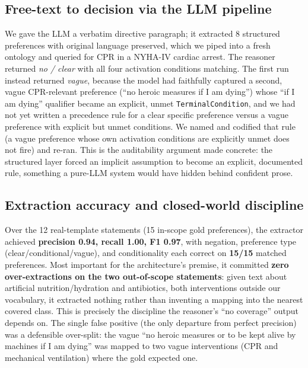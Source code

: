 \documentclass[10pt]{article}
\newcommand{\onto}[1]{\texttt{\small #1}}
\begin{document}
\subsection{Free-text to decision via the LLM pipeline}
We gave the LLM a verbatim directive paragraph; it extracted 8 structured preferences with original language preserved, which we piped into a fresh ontology and queried for CPR in a NYHA-IV cardiac arrest. The reasoner returned \emph{no / clear} with all four activation conditions matching. The first run instead returned \emph{vague}, because the model had faithfully captured a second, vague CPR-relevant preference (``no heroic measures if I am dying'') whose ``if I am dying'' qualifier became an explicit, unmet \onto{TerminalCondition}, and we had not yet written a precedence rule for a clear specific preference versus a vague preference with explicit but unmet conditions. We named and codified that rule (a vague preference whose own activation conditions are explicitly unmet does not fire) and re-ran. This is the auditability argument made concrete: the structured layer forced an implicit assumption to become an explicit, documented rule, something a pure-LLM system would have hidden behind confident prose.

\subsection{Extraction accuracy and closed-world discipline}
Over the 12 real-template statements (15 in-scope gold preferences), the extractor achieved \textbf{precision 0.94, recall 1.00, F1 0.97}, with negation, preference type (clear/conditional/vague), and conditionality each correct on \textbf{15/15} matched preferences. Most important for the architecture's premise, it committed \textbf{zero over-extractions on the two out-of-scope statements}: given text about artificial nutrition/hydration and antibiotics, both interventions outside our vocabulary, it extracted nothing rather than inventing a mapping into the nearest covered class. This is precisely the discipline the reasoner's ``no coverage'' output depends on. The single false positive (the only departure from perfect precision) was a defensible over-split: the vague ``no heroic measures or to be kept alive by machines if I am dying'' was mapped to two vague interventions (CPR and mechanical ventilation) where the gold expected one.
\end{document}
